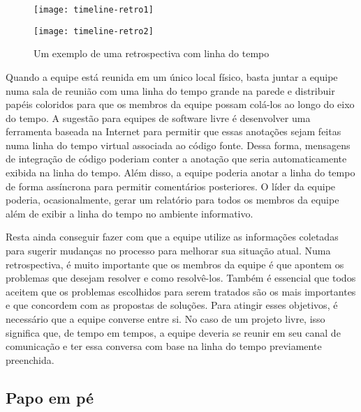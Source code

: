 

\begin{figure}[htb]
  \begin{minipage}[t]{0.5\linewidth}
    \centering
    \texttt{[image: timeline-retro1]}
  \end{minipage}
  \begin{minipage}[t]{0.5\linewidth}
    \centering
    \texttt{[image: timeline-retro2]}
  \end{minipage}
  \caption{Um exemplo de uma retrospectiva com linha do tempo}
  \label{fig:timelineretro}
\end{figure}

Quando a equipe está reunida em um único local físico, basta juntar a
equipe numa sala de reunião com uma linha do tempo grande na parede e
distribuir papéis coloridos para que os membros da equipe possam
colá-los ao longo do eixo do tempo. A sugestão para equipes de
software livre é desenvolver uma ferramenta baseada na Internet para
permitir que essas anotações sejam feitas numa linha do tempo virtual
associada ao código fonte. Dessa forma, mensagens de integração de
código poderiam conter a anotação que seria automaticamente exibida na
linha do tempo. Além disso, a equipe poderia anotar a linha do tempo
de forma assíncrona para permitir comentários posteriores. O líder da
equipe poderia, ocasionalmente, gerar um relatório para todos os
membros da equipe além de exibir a linha do tempo no ambiente
informativo.

Resta ainda conseguir fazer com que a equipe utilize as informações
coletadas para sugerir mudanças no processo para melhorar sua situação
atual. Numa retrospectiva, é muito importante que os membros da equipe
é que apontem os problemas que desejam resolver e como
resolvê-los. Também é essencial que todos aceitem que os problemas
escolhidos para serem tratados são os mais importantes e que concordem
com as propostas de soluções. Para atingir esses objetivos, é
necessário que a equipe converse entre si. No caso de um projeto
livre, isso significa que, de tempo em tempos, a equipe deveria se
reunir em seu canal de comunicação e ter essa conversa com base na
linha do tempo previamente preenchida.

\subsection{Papo em pé}
\label{subsec:stand-up}

